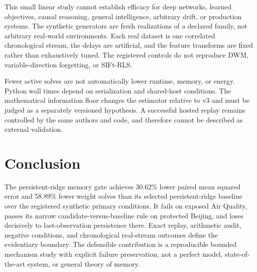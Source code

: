 \documentclass[10pt]{article}
\begin{document}
This small linear study cannot establish efficacy for deep networks, learned objectives, causal reasoning, general intelligence, arbitrary drift, or production systems. The synthetic generators are fresh realizations of a declared family, not arbitrary real-world environments. Each real dataset is one correlated chronological stream, the delays are artificial, and the feature transforms are fixed rather than exhaustively tuned. The registered controls do not reproduce DWM, variable-direction forgetting, or SIFt-RLS.

Fewer active solves are not automatically lower runtime, memory, or energy. Python wall times depend on serialization and shared-host conditions. The mathematical information floor changes the estimator relative to v3 and must be judged as a separately versioned hypothesis. A successful hosted replay remains controlled by the same authors and code, and therefore cannot be described as external validation.

\section{Conclusion}
The persistent-ridge memory gate achieves 30.62\% lower paired mean squared error and 58.89\% fewer weight solves than its selected persistent-ridge baseline over the registered synthetic primary conditions. It fails on exposed Air Quality, passes its narrow candidate-versus-baseline rule on protected Beijing, and loses decisively to last-observation persistence there. Exact replay, arithmetic audit, negative conditions, and chronological real-stream outcomes define the evidentiary boundary. The defensible contribution is a reproducible bounded mechanism study with explicit failure preservation, not a perfect model, state-of-the-art system, or general theory of memory.

\appendix
\end{document}
